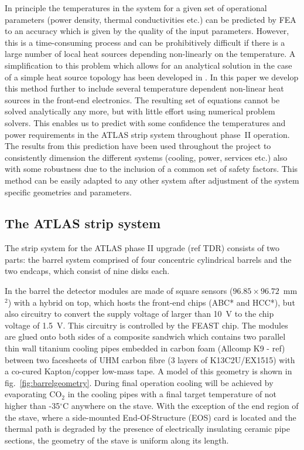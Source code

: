 In principle the temperatures in the system for a given set of operational parameters (power density, thermal conductivities etc.) can be predicted by FEA to an accuracy which is given by the quality of the input parameters. However, this is a time-consuming process and can be prohibitively difficult if there is a large number of local heat sources depending non-linearly on the temperature. A simplification to this problem which allows for an analytical solution in the case of a simple heat source topology has been developed in \cite{Beck:2010zzd}. In this paper we develop this method further to include several temperature dependent non-linear heat sources in the front-end electronics. The resulting set of equations cannot be solved analytically any more, but with little effort using numerical problem solvers. This enables us to predict with some confidence the temperatures and power requirements in the ATLAS strip system throughout phase~II operation. The results from this prediction have been used throughout the project to consistently dimension the different systems (cooling, power, services etc.) also with some robustness due to the inclusion of a common set of safety factors. This method can be easily adapted to any other system after adjustment of the system specific geometries and parameters.

\subsection{The ATLAS strip system}
The strip system for the ATLAS phase II upgrade (ref TDR) consists of two parts: the barrel system comprised of four concentric cylindrical barrels and the two endcaps, which consist of nine disks each. 

In the barrel the detector modules are made of square sensors ($96.85\times 96.72$~mm$^2$) with a hybrid on top, which hosts the front-end chips (ABC* and HCC*), but also circuitry to convert the supply voltage of larger than 10~V to the chip voltage of 1.5~V. This circuitry is controlled by the FEAST chip. The modules are glued onto both sides of a composite sandwich which contains two parallel thin wall titanium cooling pipes embedded in carbon foam (Allcomp K9 - ref)  between two facesheets of UHM carbon fibre (3 layers of K13C2U/EX1515) with a co-cured Kapton/copper low-mass tape. A model of this geometry is shown in fig.~\ref{fig:barrelgeometry}. During final operation cooling will be achieved by evaporating CO$_2$ in the cooling pipes with a final target temperature of not higher than -35$^\circ$C anywhere on the stave. With the exception of the end region of the stave, where a side-mounted End-Of-Structure (EOS) card is located and the thermal path is degraded by the presence of electrically insulating ceramic pipe sections, the geometry of the stave is uniform along its length. 

